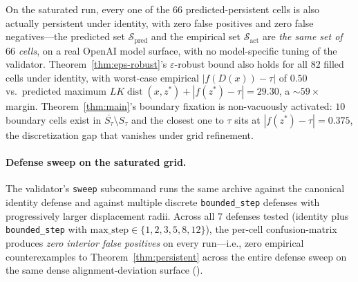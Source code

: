 \documentclass{article}
\newcommand{\cl}[1]{\overline{#1}}
\newcommand{\dist}{\operatorname{dist}}
\begin{document}
On the saturated run, every one of the $66$ predicted-persistent
cells is also actually persistent under identity, with zero false
positives and zero false negatives---the predicted set
$\mathcal{S}_{\text{pred}}$ and the empirical set
$\mathcal{S}_{\text{act}}$ are \emph{the same set of $66$ cells},
on a real OpenAI model surface, with no model-specific tuning of
the validator. Theorem~\ref{thm:eps-robust}'s $\varepsilon$-robust
bound also holds for all $82$ filled cells under identity, with
worst-case empirical $|f(D(x)) - \tau|$ of $0.50$ vs.\ predicted
maximum $LK\dist(x, z^{*}) + |f(z^{*}) - \tau| = 29.30$, a
$\sim$$59\times$ margin. Theorem~\ref{thm:main}'s boundary fixation
is non-vacuously activated: $10$ boundary cells exist in
$\cl{S_\tau} \setminus S_\tau$ and the closest one to $\tau$ sits
at $|f(z^{*}) - \tau| = 0.375$, the discretization gap that
vanishes under grid refinement.

\paragraph{Defense sweep on the saturated grid.}
The validator's \texttt{sweep} subcommand runs the same archive
against the canonical identity defense and against multiple
discrete \texttt{bounded\_step} defenses with progressively larger
displacement radii. Across all $7$ defenses tested
(identity plus \texttt{bounded\_step} with
$\text{max\_step} \in \{1, 2, 3, 5, 8, 12\}$), the per-cell
confusion-matrix produces \emph{zero interior false positives} on
every run---i.e., zero empirical counterexamples to
Theorem~\ref{thm:persistent} across the entire defense sweep on
the same dense alignment-deviation surface
().
\end{document}
